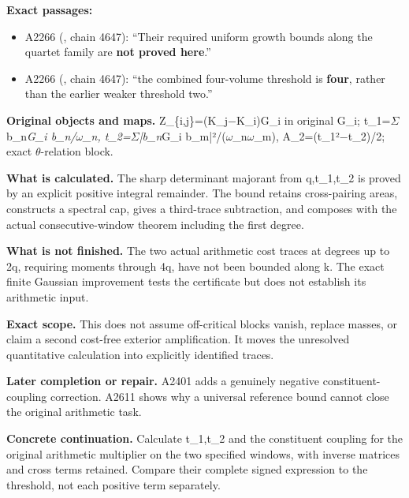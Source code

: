 \textbf{Exact passages:}

\begin{itemize}
\tightlist
\item
  A2266 (\protect{}, chain
  4647): ``Their required uniform growth bounds along the quartet family
  are \textbf{not proved here}.''
\item
  A2266 (\protect{}, chain
  4647): ``the combined four-volume threshold is \textbf{four}, rather
  than the earlier weaker threshold two.''
\end{itemize}

\textbf{Original objects and maps.}
Z\_\{i,j\}=(K\_j\allowbreak{}\ensuremath{−}\allowbreak{}K\_i)G\_i in
original G\_i; t\_1=\allowbreak{}\ensuremath{Σ}\allowbreak{}
b\_n\emph{G\_i b\_n/\allowbreak{}\ensuremath{ω}\allowbreak{}\_n,
t\_2=\allowbreak{}\ensuremath{Σ}\allowbreak{}|b\_n}G\_i
b\_m|²/(\allowbreak{}\ensuremath{ω}\allowbreak{}\_n\allowbreak{}\ensuremath{ω}\allowbreak{}\_m),
A\_2=(t\_1²\allowbreak{}\ensuremath{−}\allowbreak{}t\_2)/2; exact
\allowbreak{}\ensuremath{θ}\allowbreak{}-relation block.

\textbf{What is calculated.} The sharp determinant majorant from
q,t\_1,t\_2 is proved by an explicit positive integral remainder. The
bound retains cross-pairing areas, constructs a spectral cap, gives a
third-trace subtraction, and composes with the actual consecutive-window
theorem including the first degree.

\textbf{What is not finished.} The two actual arithmetic cost traces at
degrees up to 2q, requiring moments through 4q, have not been bounded
along k. The exact finite Gaussian improvement tests the certificate but
does not establish its arithmetic input.

\textbf{Exact scope.} This does not assume off-critical blocks vanish,
replace masses, or claim a second cost-free exterior amplification. It
moves the unresolved quantitative calculation into explicitly identified
traces.

\textbf{Later completion or repair.} A2401 adds a genuinely negative
constituent-coupling correction. A2611 shows why a universal reference
bound cannot close the original arithmetic task.

\textbf{Concrete continuation.} Calculate t\_1,t\_2 and the constituent
coupling for the original arithmetic multiplier on the two specified
windows, with inverse matrices and cross terms retained. Compare their
complete signed expression to the threshold, not each positive term
separately.

